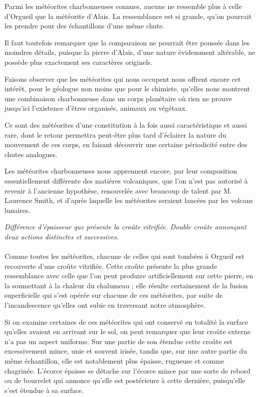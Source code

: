 \documentclass[a4paper, 11pt, oneside, polutonikogreek, french]{article}
\begin{document}
Parmi les météorites charbonneuses connues, aucune ne ressemble plus à celle d'Orgueil que la météorite d'Alais. La ressemblance est si grande, qu'on pourrait les prendre pour des échantillons d'une même chute.

Il faut toutefois remarquer que la comparaison ne pourrait être poussée dans les moindres détails, puisque la pierre d'Alais, d'une nature évidemment altérable, ne possède plus exactement ses caractères originels.

Faisons observer que les météorites qui nous occupent nous offrent encore cet intérêt, pour le géologue non moins que pour le chimiste, qu'elles nous montrent une combinaison charbonneuse dans un corps planétaire où rien ne prouve jusqu'ici l'existence d'êtres organisés, animaux ou végétaux.

Ce sont des météorites d'une constitution à la fois aussi caractéristique et aussi rare, dont le retour permettra peut-être plus tard d'éclairer la nature du mouvement de ces corps, en faisant découvrir une certaine périodicité entre des chutes analogues.

Les météorites charbonneuses nous apprennent encore, par leur composition essentiellement différente des matières volcaniques, que l'on n'est pas autorisé à revenir à l'ancienne hypothèse, renouvelée avec beaucoup de talent par M. Laurence Smith, et d'après laquelle les météorites seraient lancées par les volcans lunaires.
\begin{center}
\emph{Différence d'épaisseur que présente la croûte vitrifiée. Double croûte annonçant deux actions distinctes et successives.}
\end{center}
\paragraph{}
Comme toutes les météorites, chacune de celles qui sont tombées à Orgueil est recouverte d'une croûte vitrifiée. Cette croûte présente la plus grande ressemblance avec celle que l'on peut produire artificiellement sur cette pierre, en la soumettant à la chaleur du chalumeau ; elle résulte certainement de la fusion superficielle qui s'est opérée sur chacune de ces météorites, par suite de l'incandescence qu'elles ont subie en traversant notre atmosphère.

Si on examine certaines de ces météorites qui ont conservé en totalité la surface qu'elles avaient en arrivant sur le sol, on peut remarquer que leur croûte externe n'a pas un aspect uniforme. Sur une partie de son étendue cette croûte est excessivement mince, unie et souvent irisée, tandis que, sur une autre partie du même échantillon, elle est notablement plus épaisse, rugueuse et comme chagrinée. L'écorce épaisse se détache sur l'écorce mince par une sorte de rebord ou de bourrelet qui annonce qu'elle est postérieure à cette dernière, puisqu'elle s'est étendue à sa surface.
\end{document}
